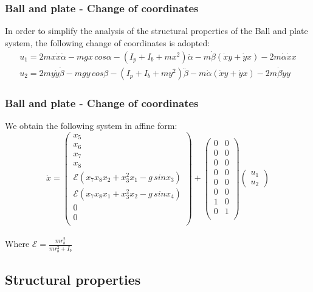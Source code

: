 %
\begin{frame}
\frametitle{Ball and plate - Change of coordinates}
In order to simplify the analysis of the structural properties of the Ball and plate system, the following change of coordinates is adopted:
\begin{align}
	u_1 = 2mx\dot{x}\dot{\alpha} - mgx\,cos\alpha - \left(I_p + I_b + mx^2\right)\ddot{\alpha} - m\dot{\beta}\left(\dot{x}y + \dot{y}x\right) - 2m\dot{\alpha}\dot{x}x \nonumber \\
	u_2 = 2my\dot{y}\dot{\beta} - mgy\,cos\beta - \left(I_p + I_b + my^2\right)\ddot{\beta} - m\dot{\alpha}\left(\dot{x}y + \dot{y}x\right) - 2m\dot{\beta}\dot{y}y \nonumber
\end{align}
\end{frame}
%
\begin{frame}
\frametitle{Ball and plate - Change of coordinates}
We obtain the following system in affine form:
\begin{equation}\label{BP_equations}
\dot{x} =%
	\begin{pmatrix}
	x_5\\
	x_6\\
	x_7\\
	x_8\\
	\mathcal{E}(x_7x_8x_2 + x^2_3x_1 - g\,sinx_3)\\
	\mathcal{E}(x_7x_8x_1 + x^2_3x_2 - g\,sinx_4)\\
	0\\
	0\\
	\end{pmatrix}
	+
	\begin{pmatrix}
		0 &0\\
		0 &0\\
		0 &0\\
		0 &0\\
		0 &0\\
		0 &0\\
		1 &0\\
		0 &1\\
	\end{pmatrix}
	\begin{pmatrix}
		u_1\\
	 	u_2
	\end{pmatrix}
\end{equation}\\[10pt]
Where $\mathcal{E} = \frac{mr^2_b}{mr^2_b + I_b}$
\end{frame}
%
\subsection{Structural properties}

